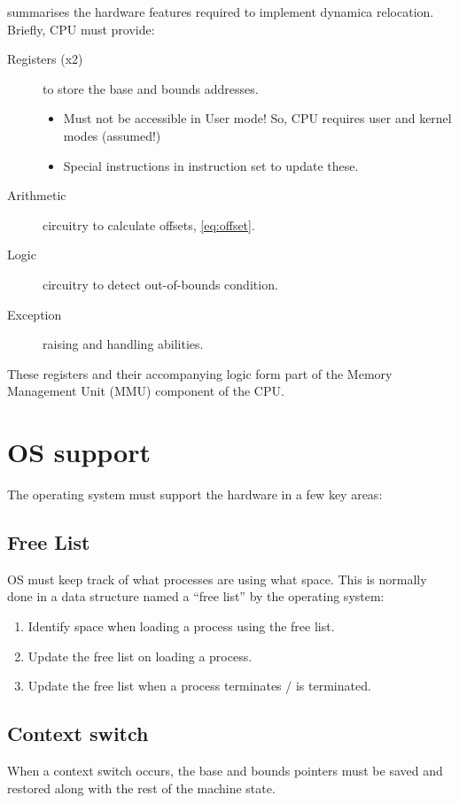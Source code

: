 \citet[Figure 15.3]{arpaci-dusseau:2015:operating} summarises the hardware features required to implement dynamica relocation. 
Briefly, CPU must provide:
\begin{description}
\item[Registers (x2)] to store the base and bounds addresses.
  \begin{itemize}
  \item Must not be accessible in User mode! So, CPU requires user and kernel modes (assumed!)
  \item Special instructions in instruction set to update these.
  \end{itemize}
\item[Arithmetic] circuitry to calculate offsets, \autoref{eq:offset}.
\item[Logic] circuitry to detect out-of-bounds condition.
\item[Exception] raising and handling abilities.
\end{description}
These registers and their accompanying logic form part of the Memory Management Unit (MMU) component of the CPU.


\section{OS support}

The operating system must support the hardware in a few key areas:

\subsection{Free List}

OS must keep track of what processes are using what space. This is normally done in a data structure named a ``free list'' by the operating system: 
\begin{enumerate}
\item Identify space when loading a process using the free list.
\item Update the free list on loading a process.
\item Update the free list when a process terminates / is terminated.
\end{enumerate}

\subsection{Context switch}

When a context switch occurs, the base and bounds pointers must be saved and restored along with the rest of the machine state.

